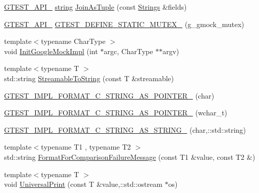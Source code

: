\begin{DoxyCompactItemize}
\item 
\hyperlink{gtest-port_8h_aa73be6f0ba4a7456180a94904ce17790}{G\+T\+E\+S\+T\+\_\+\+A\+P\+I\+\_\+} \hyperlink{namespacetesting_1_1internal_a8e8ff5b11e64078831112677156cb111}{string} \hyperlink{namespacetesting_1_1internal_a61d60981533cb0875bad9025e0d98b74}{Join\+As\+Tuple} (const \hyperlink{namespacetesting_1_1internal_a7706b17f05f4b49e351b052ae4e05073}{Strings} \&fields)
\item 
\hyperlink{gtest-port_8h_aa73be6f0ba4a7456180a94904ce17790}{G\+T\+E\+S\+T\+\_\+\+A\+P\+I\+\_\+} \hyperlink{namespacetesting_1_1internal_a8c4aa7be8daa7b60e293071d70a89584}{G\+T\+E\+S\+T\+\_\+\+D\+E\+F\+I\+N\+E\+\_\+\+S\+T\+A\+T\+I\+C\+\_\+\+M\+U\+T\+E\+X\+\_\+} (g\+\_\+gmock\+\_\+mutex)
\item 
{\footnotesize template$<$typename Char\+Type $>$ }\\void \hyperlink{namespacetesting_1_1internal_a3823844199df88af9493026031cf7744}{Init\+Google\+Mock\+Impl} (int $\ast$argc, Char\+Type $\ast$$\ast$argv)
\item 
{\footnotesize template$<$typename T $>$ }\\std\+::string \hyperlink{namespacetesting_1_1internal_aad4beed95d0846e6ffc5da0978ef3bb9}{Streamable\+To\+String} (const T \&streamable)
\item 
\hyperlink{namespacetesting_1_1internal_a3682f962ae0ec1c0eca6444ca0a09e91}{G\+T\+E\+S\+T\+\_\+\+I\+M\+P\+L\+\_\+\+F\+O\+R\+M\+A\+T\+\_\+\+C\+\_\+\+S\+T\+R\+I\+N\+G\+\_\+\+A\+S\+\_\+\+P\+O\+I\+N\+T\+E\+R\+\_\+} (char)
\item 
\hyperlink{namespacetesting_1_1internal_a85e08f00d443221e529a0a85a90fbaeb}{G\+T\+E\+S\+T\+\_\+\+I\+M\+P\+L\+\_\+\+F\+O\+R\+M\+A\+T\+\_\+\+C\+\_\+\+S\+T\+R\+I\+N\+G\+\_\+\+A\+S\+\_\+\+P\+O\+I\+N\+T\+E\+R\+\_\+} (wchar\+\_\+t)
\item 
\hyperlink{namespacetesting_1_1internal_a9dceb71a64d780beb2db1ed5bf24ad3f}{G\+T\+E\+S\+T\+\_\+\+I\+M\+P\+L\+\_\+\+F\+O\+R\+M\+A\+T\+\_\+\+C\+\_\+\+S\+T\+R\+I\+N\+G\+\_\+\+A\+S\+\_\+\+S\+T\+R\+I\+N\+G\+\_\+} (char,\+::std\+::string)
\item 
{\footnotesize template$<$typename T1 , typename T2 $>$ }\\std\+::string \hyperlink{namespacetesting_1_1internal_a91ab078f10adc669f09b7f604975c518}{Format\+For\+Comparison\+Failure\+Message} (const T1 \&value, const T2 \&)
\item 
{\footnotesize template$<$typename T $>$ }\\void \hyperlink{namespacetesting_1_1internal_ad121a890bddf866e59605d1a0198dada}{Universal\+Print} (const T \&value,\+::std\+::ostream $\ast$os)
$$
\end{DoxyCompactItemize}
